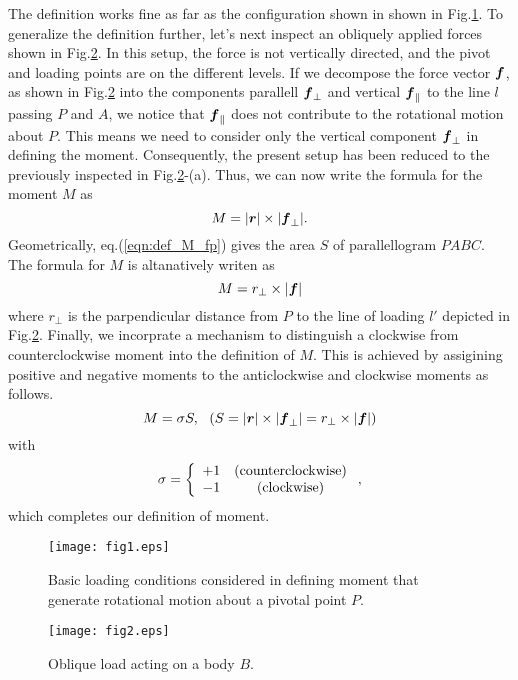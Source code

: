 \documentclass[10pt,a4j]{article}
\begin{document}
The definition works fine as far as the configuration shown in shown in Fig.\ref{fig:fig1}.
To generalize the definition further, let's next inspect an obliquely applied forces
 shown in Fig.\ref{fig:fig2}.
In this setup, the force is not vertically directed, and the pivot and loading points are on the different levels.
If we decompose the force vector $\mbox{\boldmath $f$}$, as shown in Fig.\ref{fig:fig2} into the components parallell $\mbox{\boldmath $f$}_{\perp}$ 
and vertical $\mbox{\boldmath $f$}_\parallel$ to the line $l$ passing $P$ and $A$, we notice that $\mbox{\boldmath $f$}_{\parallel}$ does not 
contribute to the rotational motion about $P$. 
This means we need to consider only the vertical component $\mbox{\boldmath $f$}_{\perp}$ in defining the moment. 
Consequently, the present setup has been reduced to the previously inspected in Fig.\ref{fig:fig2}-(a).
Thus, we can now write the formula for the moment $M$ as 
\begin{equation}
	M=|\mbox{\boldmath $r$}|\times |\mbox{\boldmath $f$}_{\perp}|.
	\label{eqn:def_M_fp}
\end{equation}
Geometrically, eq.(\ref{eqn:def_M_fp}) gives the area $S$ of parallellogram $PABC$. 
The formula for $M$ is altanatively writen as
\begin{equation}
	M=r_\perp \times |\mbox{\boldmath $f$}|
	\label{eqn:}
\end{equation}
where $r_\perp$ is the parpendicular distance from $P$ to the line of loading 
$l'$ depicted in Fig.\ref{fig:fig2}.
Finally, we incorprate a mechanism to distinguish a clockwise from counterclockwise 
moment into the definition of $M$. This is achieved by assigining positive 
and negative moments to the anticlockwise and clockwise moments as follows.
\begin{equation}
	M=\sigma S , \ \ \left(S= |\mbox{\boldmath $r$}|\times |\mbox{\boldmath $f$}_{\perp}|=r_\perp \times |\mbox{\boldmath $f$}| \right)
	\label{eqn:M_def}
\end{equation}
with 
\begin{equation}
	\sigma=\left\{
		\begin{array}{cc}
			+1 & ({\rm counterclockwise}) \\
			-1 & ({\rm clockwise}) 
		\end{array}
	\right.
	,
	\label{eqn:sign}
\end{equation}
which completes our definition of moment. 
\begin{figure}[h]
	\begin{center}
	\texttt{[image: fig1.eps]} 
	\end{center}
	\caption{
		Basic loading conditions considered in defining moment that generate 
		rotational motion about a pivotal point $P$.} 
	\label{fig:fig1}
\end{figure}
\begin{figure}[h]
	\begin{center}
	\texttt{[image: fig2.eps]} 
	\end{center}
	\caption{Oblique load acting on a body $B$.} 
	\label{fig:fig2}
\end{figure}
\end{document}
